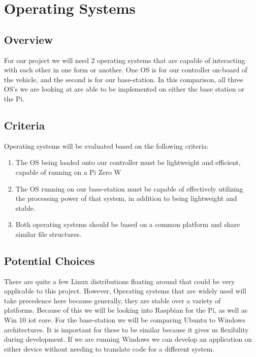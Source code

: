 \documentclass[letterpaper, 10, draftclsnofoot, onecolumn, compsoc]{IEEEtran}
\begin{document}


\section{Operating Systems}

\subsection{Overview}

For our project we will need 2 operating systems that are capable 
of interacting with each other in one form or another. One OS is for 
our controller on-board of the vehicle, and the second is for our 
base-station. In this comparison, all three OS's we are looking at 
are able to be implemented on either the base station or the Pi.  

\subsection{Criteria}

Operating systems will be evaluated based on the following criteria:
\begin{enumerate}
\item{The OS being loaded onto our controller must be lightweight 
and efficient, capable of running on a Pi Zero W}

\item{The OS running on our base-station must be capable of 
effectively utilizing the processing power of that system, in 
addition to being lightweight and stable.}

\item{Both operating systems should be based on a common platform 
and share similar file structures.}
\end{enumerate}

\subsection{Potential Choices}

There are quite a few Linux distributions floating around that 
could be very applicable to this project. However, Operating 
systems that are widely used will take precedence here because 
generally, they are stable over a variety of platforms. Because of 
this we will be looking into Raspbian for the Pi, as well as Win 10 
iot core. For the base-station we will be comparing Ubuntu to 
Windows architectures. It is important for these to be similar 
because it gives us flexibility during development. If we are 
running Windows we can develop an application on either device 
without needing to translate code for a different system.
\end{document}
